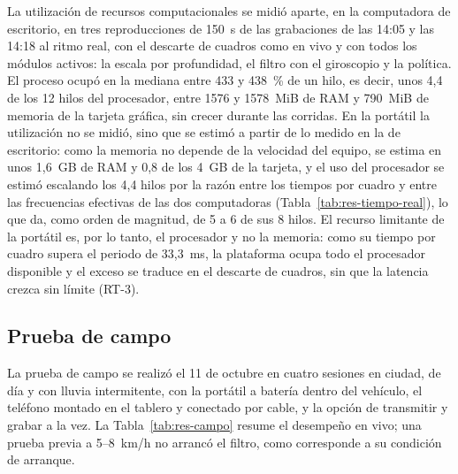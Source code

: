 La utilización de recursos computacionales se midió aparte, en la computadora de escritorio, en tres reproducciones de 150~s de las grabaciones de las 14:05 y las 14:18 al ritmo real, con el descarte de cuadros como en vivo y con todos los módulos activos: la escala por profundidad, el filtro con el giroscopio y la política.
El proceso ocupó en la mediana entre 433 y 438~\% de un hilo, es decir, unos 4,4 de los 12 hilos del procesador, entre 1576 y 1578~MiB de RAM y 790~MiB de memoria de la tarjeta gráfica, sin crecer durante las corridas.
En la portátil la utilización no se midió, sino que se estimó a partir de lo medido en la de escritorio: como la memoria no depende de la velocidad del equipo, se estima en unos 1,6~GB de RAM y 0,8 de los 4~GB de la tarjeta, y el uso del procesador se estimó escalando los 4,4 hilos por la razón entre los tiempos por cuadro y entre las frecuencias efectivas de las dos computadoras (Tabla~\ref{tab:res-tiempo-real}), lo que da, como orden de magnitud, de 5 a 6 de sus 8 hilos.
El recurso limitante de la portátil es, por lo tanto, el procesador y no la memoria: como su tiempo por cuadro supera el periodo de 33,3~ms, la plataforma ocupa todo el procesador disponible y el exceso se traduce en el descarte de cuadros, sin que la latencia crezca sin límite (RT-3).

\subsection{Prueba de campo}
\label{sec:res-campo}

La prueba de campo se realizó el 11 de octubre en cuatro sesiones en ciudad, de día y con lluvia intermitente, con la portátil a batería dentro del vehículo, el teléfono montado en el tablero y conectado por cable, y la opción de transmitir y grabar a la vez.
La Tabla~\ref{tab:res-campo} resume el desempeño en vivo; una prueba previa a 5--8~km/h no arrancó el filtro, como corresponde a su condición de arranque.

